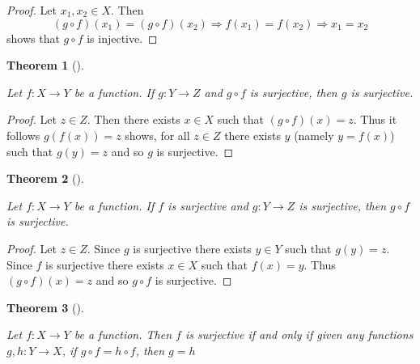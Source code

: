 \documentclass[
  letterpaper,
  10pt,
  reqno,
  twopage,
  openany]{book}
\theoremstyle{plain}
\theoremstyle{definition}
\theoremstyle{definition}
\theoremstyle{definition}
\theoremstyle{plain}
\theoremstyle{plain}
\newtheorem{theorem}{Theorem}[chapter]
\theoremstyle{remark}
\begin{document}
\begin{proof}

Let \(x_1, x_2\in X\). Then \[
(g\circ f)(x_1)=(g\circ f)(x_2) 
\Longrightarrow f(x_1)=f(x_2) 
\Longrightarrow x_1= x_2 
\] shows that \(g\circ f\) is injective.

\end{proof}

\leavevmode{}%
\begin{theorem}[]\label{thm-circ-surjective}

Let \(f:X\to Y\) be a function. If \(g:Y\to Z\) and \(g\circ f\) is
surjective, then \(g\) is surjective.

\end{theorem}

\begin{proof}

Let \(z\in Z\). Then there exists \(x\in X\) such that
\((g\circ f)(x)=z\). Thus it follows \(g(f(x))=z\) shows, for all
\(z\in Z\) there exists \(y\) (namely \(y=f(x)\)) such that \(g(y)=z\)
and so \(g\) is surjective.

\end{proof}

\leavevmode{}%
\begin{theorem}[]\label{thm-surjective}

Let \(f:X\to Y\) be a function. If \(f\) is surjective and \(g:Y\to Z\)
is surjective, then \(g\circ f\) is surjective.

\end{theorem}

\begin{proof}

Let \(z\in Z\). Since \(g\) is surjective there exists \(y\in Y\) such
that \(g(y)=z\). Since \(f\) is surjective there exists \(x\in X\) such
that \(f(x)=y\). Thus \((g\circ f)(x)=z\) and so \(g\circ f\) is
surjective.

\end{proof}

\leavevmode{}%
\begin{theorem}[]\label{thm-surjective-iff}

Let \(f:X\to Y\) be a function. Then \(f\) is surjective if and only if
given any functions \(g,h:Y\to X\), if \(g\circ f=h\circ f\), then
\(g=h\)

\end{theorem}
\end{document}
